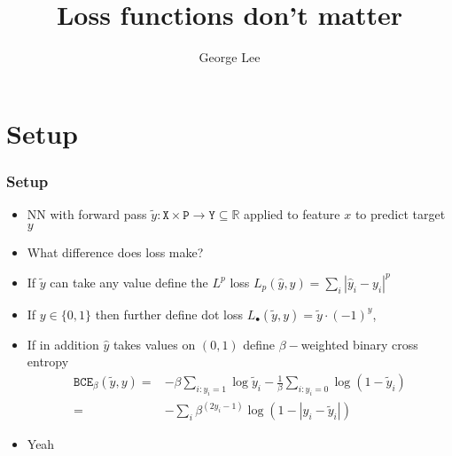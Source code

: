 \documentclass{beamer}
\title{Loss functions don't matter}
\subtitle{George Lee}
\newcommand{\IN}{{\texttt{X}}}
\newcommand{\OUT}{{\texttt{Y}}}
\newcommand{\PAR}{{\texttt{P}}}
\newcommand{\PREDSMOOTH}{{\tilde y}}%
\newcommand{\yP}{{\hat y}}
\newcommand{\BCE}{{\texttt{BCE}}}
\begin{document}
\begin{frame}
\titlepage
\end{frame}

\section{Setup}
\begin{frame}
\frametitle{Setup}
\begin{itemize}
\item
  NN with forward pass $\PREDSMOOTH:\IN\times\PAR\rightarrow\OUT\subseteq\mathbb R$ applied to feature $x$ to predict target $y$
\item
  What difference does loss make?
\item
  If $\PREDSMOOTH$ can take any value define the $L^p$ loss $L_p(\yP,y)=\sum_i|\yP_i-y_i|^p$
\item
  If $y\in\{0,1\}$ then further define dot loss $L_\bullet(\PREDSMOOTH,y)=\PREDSMOOTH\cdot(-1)^y$,
\item
  If in addition $\yP$ takes values on $(0,1)$ define $\beta-$weighted binary cross entropy
  \begin{align*}
    \BCE_\beta(\PREDSMOOTH,y)=&-\beta\sum_{i:y_i=1}\log\PREDSMOOTH_i-\tfrac1\beta\sum_{i:y_i=0}\log(1-\PREDSMOOTH_i)\\
    =&-\sum_i\beta^{(2y_i-1)}\log(1-|y_i-\PREDSMOOTH_i|)
  \end{align*}
\end{itemize}
\end{frame}
\begin{frame}
  \begin{itemize}
    \item
      Yeah
  \end{itemize}
\end{frame}
\end{document}
